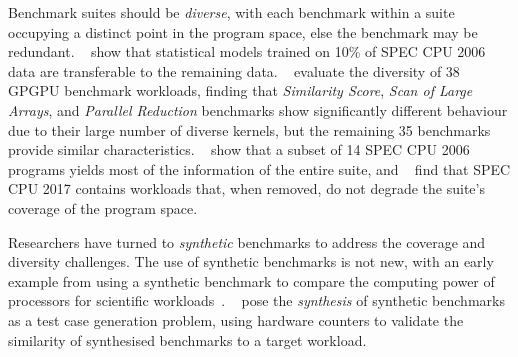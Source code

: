 Benchmark suites should be \emph{diverse}, with each benchmark within a suite occupying a distinct point in the program space, else the benchmark may be redundant.
\citeauthor{Ould-Ahmed-Vall2008}~\cite{Ould-Ahmed-Vall2008} show that statistical models trained on 10\% of SPEC CPU 2006 data are transferable to the remaining data.
\citeauthor{Goswami2010}~\cite{Goswami2010} evaluate the diversity of 38 GPGPU benchmark workloads, finding that \emph{Similarity Score}, \emph{Scan of Large Arrays}, and \emph{Parallel Reduction} benchmarks show significantly different behaviour due to their large number of diverse kernels, but the remaining 35 benchmarks provide similar characteristics.
\citeauthor{Phansalkar2007}~\cite{Phansalkar2007} show that a subset of 14 SPEC CPU 2006 programs yields most of the information of the entire suite, and
\citeauthor{Draft2018}~\cite{Draft2018} find that SPEC CPU 2017 contains workloads that, when removed, do not degrade the suite's coverage of the program space.

Researchers have turned to \emph{synthetic} benchmarks to address the coverage and diversity challenges.
The use of synthetic benchmarks is not new, with an early example from \citeyear{Curnow1976} using a synthetic benchmark to compare the computing power of processors for scientific workloads~\cite{Curnow1976}.
\citeauthor{Bell2005}~\cite{Bell2005} pose the \emph{synthesis} of synthetic benchmarks as a test case generation problem, using hardware counters to validate the similarity of synthesised benchmarks to a target workload.

